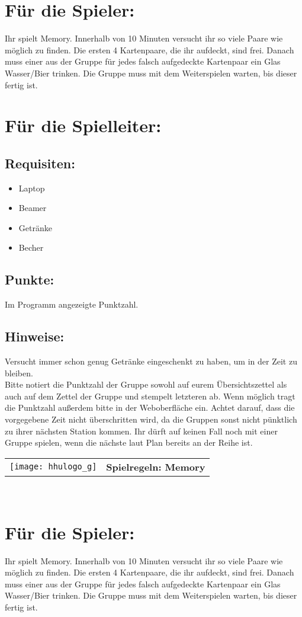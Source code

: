 \documentclass[a4paper,10pt]{article}
\def\spielg{Memory}
\newcommand{\unten}{
 Bitte notiert die Punktzahl der Gruppe sowohl auf eurem Übersichtszettel als auch auf dem Zettel der Gruppe und stempelt letzteren ab. Wenn möglich tragt die Punktzahl außerdem bitte in der Weboberfläche ein.
 Achtet darauf, dass die vorgegebene Zeit nicht überschritten wird, da die Gruppen sonst nicht pünktlich zu ihrer nächsten Station kommen. Ihr dürft auf keinen Fall noch mit einer Gruppe spielen, wenn die nächste laut Plan bereits an der Reihe ist.
}
\begin{document}
\Large
\section*{Für die Spieler:}
Ihr spielt Memory. Innerhalb von 10 Minuten versucht ihr so viele Paare wie möglich zu finden. Die ersten 4 Kartenpaare, die ihr aufdeckt, sind frei. Danach muss einer aus der Gruppe für jedes falsch aufgedeckte Kartenpaar ein Glas Wasser/Bier trinken. Die Gruppe muss mit dem Weiterspielen warten, bis dieser fertig ist.

\section*{Für die Spielleiter:}
\subsection*{Requisiten:} 
\begin{itemize}
 \item Laptop
 \item Beamer
 \item Getränke
 \item Becher
\end{itemize}
\subsection*{Punkte:}
Im Programm angezeigte Punktzahl.

\subsection*{Hinweise:}
Versucht immer schon genug Getränke eingeschenkt zu haben, um in der Zeit zu bleiben.\\
\unten

\newpage


  \begin{tabularx}{\textwidth}{lc}
    \texttt{[image: hhulogo\_g]}
  & {\Huge \textbf{Spielregeln: \spielg}}
  \end{tabularx}\\

\Large
\section*{Für die Spieler:}
Ihr spielt Memory. Innerhalb von 10 Minuten versucht ihr so viele Paare wie möglich zu finden. Die ersten 4 Kartenpaare, die ihr aufdeckt, sind frei. Danach muss einer aus der Gruppe für jedes falsch aufgedeckte Kartenpaar ein Glas Wasser/Bier trinken. Die Gruppe muss mit dem Weiterspielen warten, bis dieser fertig ist.
\end{document}

